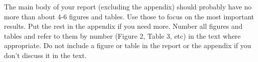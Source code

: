 \documentclass{mynotes}
\begin{document}
The main body of your report (excluding the appendix) should probably have no more than about 4-6 figures and tables.  Use those to focus on the most important results.  Put the rest in the appendix if you need more.  Number all figures and tables and refer to them by number (Figure 2, Table 3, etc) in the text where appropriate.  Do not include a figure or table in the report or the appendix if you don't discuss it in the text.
\end{document}

